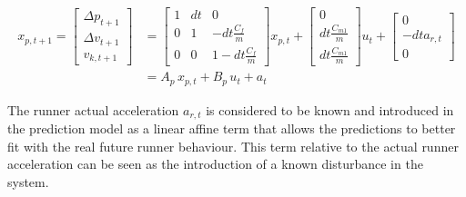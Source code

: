 \documentclass[a4paper,12pt,oneside]{book}
\begin{document}
\begin{equation}
\begin{aligned}
    x_{p,t+1} = 
        \begin{bmatrix}
            \Delta p_{t+1}  \\
            \Delta v_{t+1} \\
            v_{k,t+1}
        \end{bmatrix}
        & =
        \begin{bmatrix}
            1 & dt & 0 \\
            0 & 1 & -dt\frac{C_f}{m} \\
            0 & 0 & 1-dt\frac{C_f}{m}
        \end{bmatrix}
        x_{p,t}
        +
        \begin{bmatrix}
            0 \\
            dt \frac{C_{m1}}{m} \\
            dt \frac{C_{m1}}{m}
        \end{bmatrix}
        u_t + 
        \begin{bmatrix}
        0 \\
        - dt a_{r,t} \\
        0
        \end{bmatrix} \\
        & = A_p \, x_{p,t} + B_p \, u_t + a_t
\end{aligned}
\label{Prediction_model_MPC}
\end{equation}

The runner actual acceleration $a_{r,t}$ is considered to be known and introduced in the prediction model as a linear affine term that allows the predictions to better fit with the real future runner behaviour.
This term relative to the actual runner acceleration can be seen as the introduction of a known disturbance in the system.
\end{document}
